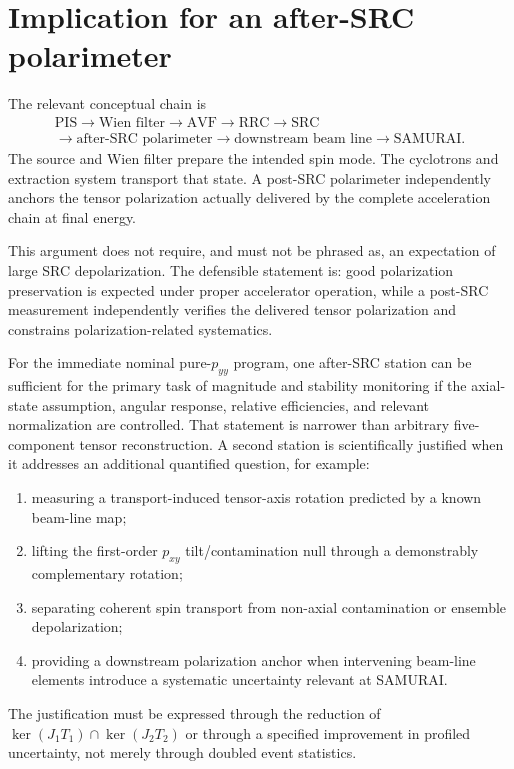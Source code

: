 \documentclass[11pt,a4paper]{article}
\begin{document}
\section{Implication for an after-SRC polarimeter}

The relevant conceptual chain is
\begin{equation}
 \begin{gathered}
 \text{PIS}\rightarrow\text{Wien filter}\rightarrow\text{AVF}
 \rightarrow\text{RRC}\rightarrow\text{SRC}\\
 \rightarrow\boxed{\text{after-SRC polarimeter}}
 \rightarrow\text{downstream beam line}\rightarrow\text{SAMURAI}.
 \end{gathered}
\end{equation}
The source and Wien filter prepare the intended spin mode.  The cyclotrons and
extraction system transport that state.  A post-SRC polarimeter independently
anchors the tensor polarization actually delivered by the complete acceleration
chain at final energy.

This argument does not require, and must not be phrased as, an expectation of
large SRC depolarization.  The defensible statement is: good polarization
preservation is expected under proper accelerator operation, while a post-SRC
measurement independently verifies the delivered tensor polarization and
constrains polarization-related systematics.

For the immediate nominal pure-$p_{yy}$ program, one after-SRC station can be
sufficient for the primary task of magnitude and stability monitoring if the
axial-state assumption, angular response, relative efficiencies, and relevant
normalization are controlled.  That statement is narrower than arbitrary
five-component tensor reconstruction.  A second station is scientifically
justified when it addresses an additional quantified question, for example:
\begin{enumerate}
 \item measuring a transport-induced tensor-axis rotation predicted by a known
 beam-line map;
 \item lifting the first-order $p_{xy}$ tilt/contamination null through a
 demonstrably complementary rotation;
 \item separating coherent spin transport from non-axial contamination or
 ensemble depolarization;
 \item providing a downstream polarization anchor when intervening beam-line
 elements introduce a systematic uncertainty relevant at SAMURAI.
\end{enumerate}
The justification must be expressed through the reduction of
$\ker(J_1T_1)\cap\ker(J_2T_2)$ or through a specified improvement in profiled
uncertainty, not merely through doubled event statistics.
\end{document}
